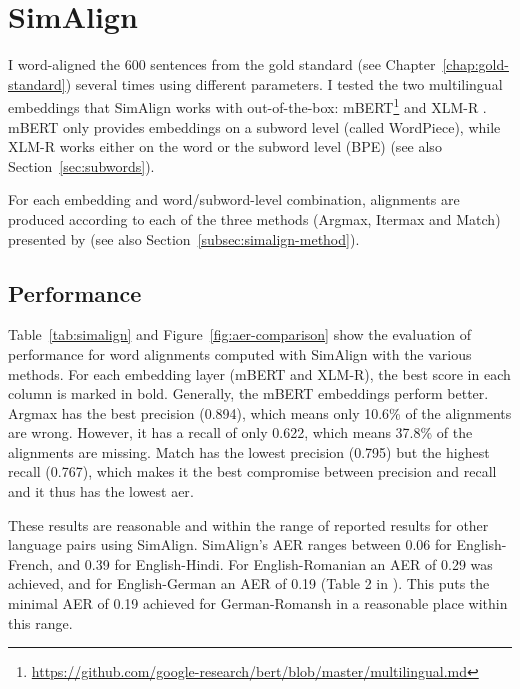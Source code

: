 \section{SimAlign}\label{sec:performance-simalign}
I word-aligned the 600 sentences from the gold standard (see Chapter~\ref{chap:gold-standard}) several times using different parameters. 
I tested the two multilingual embeddings that SimAlign works with out-of-the-box: mBERT\footnote{\url{https://github.com/google-research/bert/blob/master/multilingual.md}} and XLM-R \autocite{conneau-etal-2020-xlm}. 
mBERT only provides embeddings on a subword level (called WordPiece), while XLM-R works either on the word or the subword level (BPE) \autocite{jalili-sabet-etal-2020-simalign} (see also Section~\ref{sec:subwords}). 

For each embedding and word/subword-level combination, alignments are produced according to each of the three methods (Argmax, Itermax and Match) presented by \textcite{jalili-sabet-etal-2020-simalign} (see also Section~\ref{subsec:simalign-method}).

\subsection{Performance}
Table~\ref{tab:simalign} and Figure~\ref{fig:aer-comparison} show the evaluation of performance for word alignments computed with SimAlign with the various methods. 
For each embedding layer (mBERT and XLM-R), the best score in each column is marked in bold. 
Generally, the mBERT embeddings perform better. 
Argmax has the best precision (0.894), which means only 10.6\% of the alignments are wrong. 
However, it has a recall of only 0.622, which means 37.8\% of the alignments are missing.
Match has the lowest precision (0.795) but the highest recall (0.767), which makes it the best compromise between precision and recall and it thus has the lowest \acrshort{aer}.

These results are reasonable and within the range of reported results for other language pairs using SimAlign. 
SimAlign's AER ranges between 0.06 for English-French, and 0.39 for English-Hindi. 
For English-Romanian an AER of 0.29 was achieved, and for English-German an AER of 0.19 (Table 2 in \textcite{jalili-sabet-etal-2020-simalign}). 
This puts the minimal AER of 0.19 achieved for German-Romansh in a reasonable place within this range.

